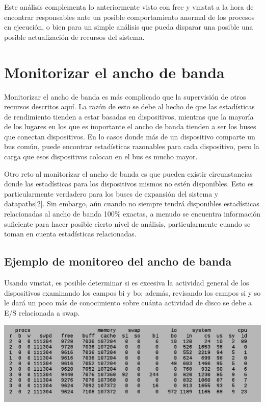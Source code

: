 \documentclass[12pt]{article}
\begin{document}
Este análisis complementa lo anteriormente visto con free y vmstat a la
hora de encontrar responsables ante un posible comportamiento anormal 
de los procesos en ejecución, o bien para un simple análisis que pueda 
disparar una posible una posible actualización de recursos del sistema. 

\section*{Monitorizar el ancho de banda}
Monitorizar el ancho de banda es más complicado que la supervisión de otros recursos descritos aquí. La razón de esto se debe al hecho de que las estadísticas de rendimiento tienden a estar basadas en dispositivos, mientras que la mayoría de los lugares en los que es importante el ancho de banda tienden a ser los buses que conectan dispositivos. En lo casos donde más de un dispositivo comparte un bus común, puede encontrar estadísticas razonables para cada dispositivo, pero la carga que esos dispositivos colocan en el bus es mucho mayor.

Otro reto al monitorizar el ancho de banda es que pueden existir circunstancias donde las estadísticas para los dispositivos mismos no estén disponibles. Esto es particularmente verdadero para los buses de expansión del sistema y datapaths[2]. Sin embargo, aún cuando no siempre tendrá disponibles estadísticas relacionadas al ancho de banda 100\% exactas, a menudo se encuentra información suficiente para hacer posible cierto nivel de análisis, particularmente cuando se toman en cuenta estadísticas relacionadas.

\subsection*{Ejemplo de monitoreo del ancho de banda}

Usando vmstat, es posible determinar si es excesiva la actividad general de los dispositivos examinando los campos bi y bo; además, revisando los campos si y so le dará un poco más de conocimiento sobre cuánta actividad de disco se debe a E/S relacionada a swap.

\begin{center}
 \includegraphics{vmstat2.png}
\end{center}
\end{document}
